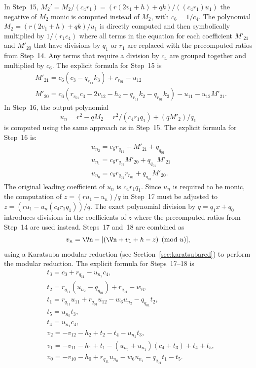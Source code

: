 In Step~15, $M_2' = M_2/(c_4r_1) = (r(2v_1 + h) + qk)/((c_4r_1)u_1)$ the
negative of $M_2$ monic is computed instead of $M_2$, with $c_6 = 1/c_4$. The
polynomial $M_2 = (r(2v_1 + h) + qk)/u_1$ is directly computed and then
symbolically multiplied by $1/(r_1c_4)$ where all terms in the equation for each
coefficient $M'_{21}$ and $M'_{20}$ that have divisions by $q_1$ or $r_1$ are
replaced with the precomputed ratios from Step~14. Any terms that require a
division by $c_4$ are grouped together and multiplied by $c_6$. The explicit
formula for Step~15 is  
\begin{align*} 
    & M'_{21} = c_6(c_3 - q_{r_{11}}k_3) + r_{r_{01}} - u_{12}    \\
    & M'_{20} = c_6(r_{r_{01}}c_3 - 2v_{12} - h_2 - q_{r_{11}}k_2 - q_{r_{01}}k_3) - u_{11} - u_{12}M'_{21}.
\end{align*}
In Step~16, the output polynomial $$u_n = r^2 - qM_2 = r^2/(c_4r_1q_1) +
(qM'_2)/q_1$$ is computed using the same approach as in Step~15. The explicit
formula for Step~16 is: 
\begin{align*} 
    & u_{n_2} = c_6r_{q_{11}} + M'_{21} + q_{q_{01}}          \\
    & u_{n_1} = c_6r_{q_{01}}M'_{20} + q_{q_{01}}M'_{21}    \\
    & u_{n_0} = c_6r_{q_{01}}r_{r_{01}} + q_{q_{01}}M'_{20}.
\end{align*}
The original leading coefficient of $u_n$ is $c_4r_1q_1$. Since $u_n$ is required to
be monic, the computation of $z = (ru_1 - u_n)/q$ in Step~17 must be adjusted to
$z = (ru_1 - u_n(c_4r_1q_1))/q$. The exact polynomial division by $q = q_1x +
q_0$ introduces divisions in the coefficients of $z$ where the precomputed
ratios from Step~14 are used instead. Steps~17 and~18 are combined as
$$v_n = \Vn - [(\Vn + v_1 + h - z) \pmod{u}],$$ using a Karatsuba modular
reduction (see Section~\ref{sec:karatsubared}) to perform the modular reduction.
The explicit formula for Steps~17--18 is
\begin{align*} 
    & t_3 = c_3 + r_{q_{11}} - u_{n_2}c_4,                   \\
    & t_2 = r_{q_{11}}(u_{n_2} - q_{q_{01}}) + r_{q_{01}} - w_6,   \\
    & t_1 = r_{q_{11}}u_{11} + r_{q_{01}}  u_{12} - w_6u_{n_2} - q_{q_{01}}t_2, \\
    & t_5 = u_{n_0}t_3,       \\
    & t_4 = u_{n_1}c_4,       \\
    & v_2 = -v_{12} - h_2 + t_2 - t_4 - u_{n_2}t_3,       \\
    & v_1 = -v_{11} - h_1 + t_1 - (u_{n_0} + u_{n_1})(c_4 + t_3) + t_4 + t_5,   \\
    & v_0 = -v_{10} - h_0 + r_{q_{11}}  u_{n_0} - w_6u_{n_1} - q_{q_{01}}t_1 - t_5.
\end{align*}

